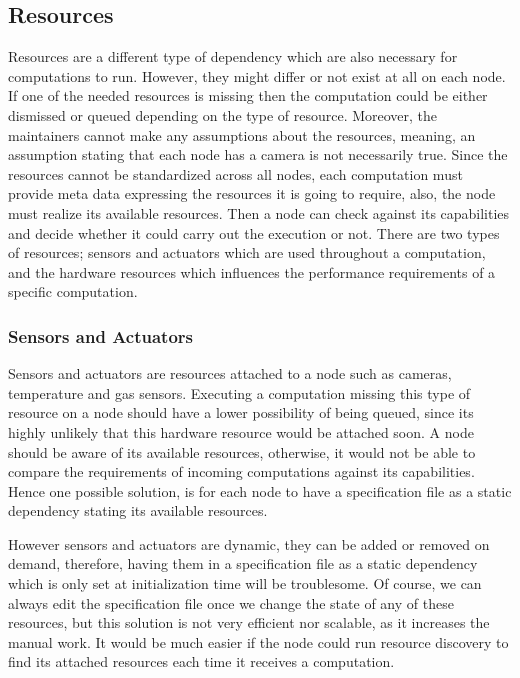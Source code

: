 \subsection {Resources}


Resources are a different type of dependency which are also necessary for computations to run. However, they might differ or not exist at all on each node. If one of the needed resources is missing then the computation could be either dismissed or queued depending on the type of resource. Moreover, the maintainers cannot make any assumptions about the resources, meaning, an assumption stating that each node has a camera is not necessarily true. Since the resources cannot be standardized across all nodes, each computation must provide meta data expressing the resources it is going to require, also, the node must realize its available resources. Then a node can check against its capabilities and decide whether it could carry out the execution or not. There are two types of resources; sensors and actuators which are used throughout a computation, and the hardware resources which influences the performance requirements of a specific computation.


\subsubsection{Sensors and Actuators}

  Sensors and actuators are resources attached to a node such as cameras, temperature and gas sensors. Executing a computation missing this type of resource on a node should have a lower possibility of being queued, since its highly unlikely that this hardware resource would be attached soon. A node should be aware of its available resources, otherwise, it would not be able to compare the requirements of incoming computations against its capabilities. Hence one possible solution, is for each node to have a specification file as a static dependency stating its available resources.
  
  However sensors and actuators are dynamic, they can be added or removed on demand, therefore, having them in a specification file as a static dependency which is only set at initialization time will be troublesome. Of course, we can always edit the specification file once we change the state of any of these resources, but this solution is not very efficient nor scalable, as it increases the manual work. It would be much easier if the node could run resource discovery to find its attached resources each time it receives a computation.
  
